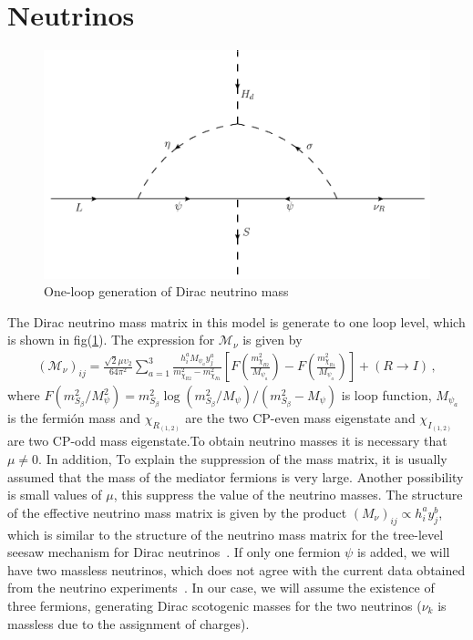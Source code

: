 \documentclass[12pt]{article}
\begin{document}
\section{Neutrinos}
\label{sec:Neutrinos}
%
\begin{figure}
\centering
\includegraphics[scale=0.75]{Figures/Neutrino_Loop.pdf}
\caption{One-loop generation of Dirac neutrino mass}
\label{fig:zee}
\end{figure}
%
 The Dirac neutrino mass matrix in this model is generate to one loop level, which is shown in fig(\ref{fig:zee}). The expression for $\mathcal{M}_{\nu}$ is given by~\cite{Reig:2018mdk}
%
\begin{align}
(\mathcal{M}_{\nu})_{ij} = \frac{\sqrt{2}\mu \upsilon_{2}}{64 \pi^{2}} \sum_{a=1}^{3} \frac{h_{i}^{a} M_{\psi_{a}}y_{j}^{a}}{m_{\chi_{R2}}^{2}-m_{\chi_{R1}}^{2}} \left[ F\left( \frac{m_{\chi_{R2}}^{2}}{M_{\psi_{a}}} \right) - F\left( \frac{m_{\chi_{R1}}^{2}}{M_{\psi_{a}}} \right) \right] + (R \to I)\,,
\end{align}
%
where $F(m_{S_{\beta}}^{2}/M_{\psi}^{2}) = m_{S_{\beta}}^{2}\log(m_{S_{\beta}}^{2}/M_{\psi})/(m_{S_{\beta}}^{2}-M_{\psi})$ is loop function, $M_{\psi_{a}}$ is the fermión mass  and $\chi_{R_(1,2)}$ are the two CP-even mass eigenstate and $\chi_{I_{(1,2)}}$ are two CP-odd mass eigenstate.To obtain neutrino masses it is necessary that $\mu \neq 0$. In addition, To explain the suppression of the mass matrix, it is usually assumed that the mass of the mediator fermions is very large. Another possibility is small values of $\mu$, this suppress the value of the neutrino masses. The structure of the effective neutrino mass matrix is given by the product $(M_{\nu})_{ij} \propto h^{a}_{i} y^{b}_{j}$, which is similar to the structure of the neutrino mass matrix for the tree-level seesaw mechanism for Dirac neutrinos~\cite{Chulia:2016ngi}. If only one fermion $\psi$ is added, we will have two massless neutrinos, which does not agree with the current data obtained from the neutrino experiments~\cite{deSalas:2017kay}. In our case, we will assume the existence of three fermions, generating Dirac scotogenic masses for the two neutrinos ($\nu_{k}$ is massless due to the assignment of charges).
\end{document}

